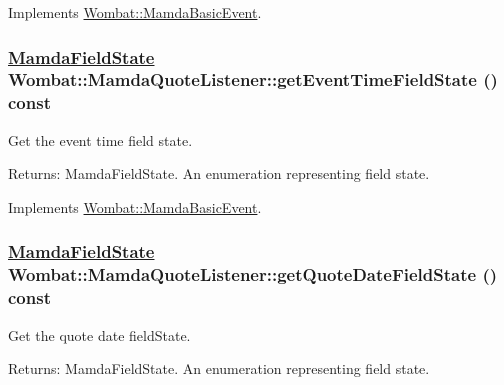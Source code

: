 Implements \hyperlink{classWombat_1_1MamdaBasicEvent_51cc0b9d4c2b8a982ccd18b339707cb5}{Wombat::Mamda\-Basic\-Event}.\hypertarget{classWombat_1_1MamdaQuoteListener_b401d95157253e35d0465c5cdb4f7da0}{
\subsubsection[getEventTimeFieldState]{\setlength{\rightskip}{0pt plus 5cm}\hyperlink{namespaceWombat_93aac974f2ab713554fd12a1fa3b7d2a}{Mamda\-Field\-State} Wombat::Mamda\-Quote\-Listener::get\-Event\-Time\-Field\-State () const}}
\label{classWombat_1_1MamdaQuoteListener_b401d95157253e35d0465c5cdb4f7da0}


Get the event time field state. 

\begin{Desc}
\item[Returns:]Mamda\-Field\-State. An enumeration representing field state. \end{Desc}


Implements \hyperlink{classWombat_1_1MamdaBasicEvent_ff3932065e16e660fb6cd9285b46f7d0}{Wombat::Mamda\-Basic\-Event}.\hypertarget{classWombat_1_1MamdaQuoteListener_bbf7249c368d73feb54836bb02a7269a}{
\subsubsection[getQuoteDateFieldState]{\setlength{\rightskip}{0pt plus 5cm}\hyperlink{namespaceWombat_93aac974f2ab713554fd12a1fa3b7d2a}{Mamda\-Field\-State} Wombat::Mamda\-Quote\-Listener::get\-Quote\-Date\-Field\-State () const}}
\label{classWombat_1_1MamdaQuoteListener_bbf7249c368d73feb54836bb02a7269a}


Get the quote date field\-State. 

\begin{Desc}
\item[Returns:]Mamda\-Field\-State. An enumeration representing field state. \end{Desc}


